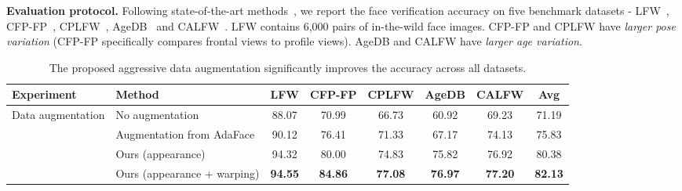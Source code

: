 \documentclass[10pt,twocolumn,letterpaper]{article}
\begin{document}
\noindent
\textbf{Evaluation protocol.} 
Following state-of-the-art methods~\cite{2020_FR_curricularface,2021_FR_dcq,2021_FR_magface,2021_FR_spherical,2022_FR_adaface}, we report the face verification accuracy on five benchmark datasets - LFW~\cite{2008_FRD_LFW}, CFP-FP~\cite{2016_FRD_CFPFP}, CPLFW~\cite{2018_FRD_CPLFW}, AgeDB~\cite{2017_FRD_AGEDB} and CALFW~\cite{2017_FRD_CALFW}. 
LFW contains 6,000 pairs of in-the-wild face images. 
CFP-FP and CPLFW have \textit{larger pose variation} (CFP-FP specifically compares frontal views to profile views). 
AgeDB and CALFW have \textit{larger age variation}.



\begin{table*}[t]
\footnotesize
\setlength{\tabcolsep}{3.0pt}
\begin{center}
\begin{tabular}{l|l|ccccc|c}
\toprule
Experiment & Method & LFW & CFP-FP & CPLFW & AgeDB & CALFW & Avg \\
\midrule
\multirow{4}{*}{Data augmentation}
& No augmentation
& 88.07 & 70.99 & 66.73 & 60.92 & 69.23 & 71.19 \\
& Augmentation from AdaFace \cite{2022_FR_adaface}
& 90.12 & 76.41 & 71.33 & 67.17 & 74.13 & 75.83 \\
& Ours (appearance)
& 94.32 & 80.00 & 74.83 & 75.82 & 76.92 & 80.38 \\
& Ours (appearance + warping)
& \textbf{94.55} & \textbf{84.86} & \textbf{77.08} & \textbf{76.97} & \textbf{77.20} & \textbf{82.13} \\
\bottomrule
\end{tabular}
\end{center}
\caption{The proposed aggressive data augmentation significantly improves the accuracy across all datasets. 
}
\label{table:data_preprocessing}
\end{table*}
\end{document}
